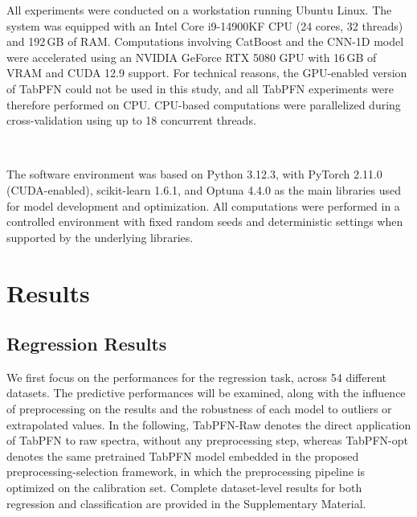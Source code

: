 \documentclass{article}
\begin{document}
All experiments were conducted on a workstation running Ubuntu Linux. The system was equipped with an Intel Core i9-14900KF CPU (24 cores, 32 threads) and 192\,GB of RAM. Computations involving CatBoost and the CNN-1D model were accelerated using an NVIDIA GeForce RTX 5080 GPU with 16\,GB of VRAM and CUDA 12.9 support. For technical reasons, the GPU-enabled version of TabPFN could not be used in this study, and all TabPFN experiments were therefore performed on CPU. CPU-based computations were parallelized during cross-validation using up to 18 concurrent threads.

~

The software environment was based on Python 3.12.3, with PyTorch 2.11.0 (CUDA-enabled), scikit-learn 1.6.1, and Optuna 4.4.0 as the main libraries used for model development and optimization. All computations were performed in a controlled environment with fixed random seeds and deterministic settings when supported by the underlying libraries.







\section{Results} \label{sec:results}

\subsection{Regression Results}

We first focus on the performances for the regression task, across 54 different datasets. The predictive performances will be examined, along with the influence of preprocessing on the results and the robustness of each model to outliers or extrapolated values. In the following, TabPFN-Raw denotes the direct application of TabPFN to raw spectra, without any preprocessing step, whereas TabPFN-opt denotes the same pretrained TabPFN model embedded in the proposed preprocessing-selection framework, in which the preprocessing pipeline is optimized on the calibration set. Complete dataset-level results for both regression and classification are provided in the Supplementary Material.
\end{document}
